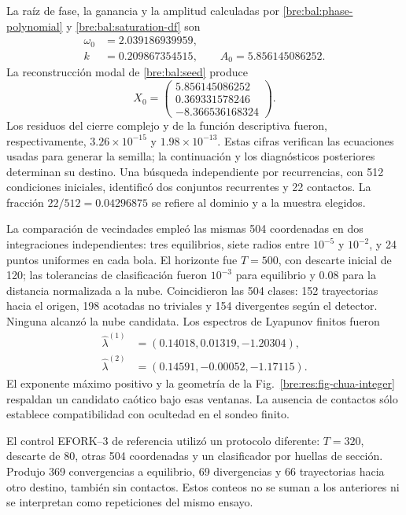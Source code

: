 La raíz de fase, la ganancia y la amplitud
calculadas por \eqref{bre:bal:phase-polynomial} y
\eqref{bre:bal:saturation-df} son
\[
 \begin{aligned}
 \omega_0&=2.039186939959,\\
 k&=0.209867354515,\qquad A_0=5.856145086252.
 \end{aligned}
\]
La reconstrucción modal de \eqref{bre:bal:seed} produce
\begin{equation}
 X_0=\begin{pmatrix}
 5.856145086252\\0.369331578246\\-8.366536168324
 \end{pmatrix}.
 \label{bre:res:chua-integer-seed}
\end{equation}
Los residuos del cierre complejo y de la función descriptiva fueron,
respectivamente, \(3.26\times10^{-15}\) y \(1.98\times10^{-13}\). Estas
cifras verifican las ecuaciones usadas para generar la semilla; la
continuación y los diagnósticos posteriores determinan su destino.
Una búsqueda independiente por recurrencias, con 512 condiciones iniciales,
identificó dos conjuntos recurrentes y 22 contactos. La fracción
\(22/512=0.04296875\) se refiere al dominio y a la muestra elegidos.

La comparación de vecindades empleó las mismas 504 coordenadas en dos
integraciones independientes: tres equilibrios, siete radios entre
\(10^{-5}\) y \(10^{-2}\), y 24 puntos uniformes en cada bola. El horizonte
fue \(T=500\), con descarte inicial de 120; las tolerancias de clasificación
fueron \(10^{-3}\) para equilibrio y \(0.08\) para la distancia normalizada
a la nube. Coincidieron las 504 clases: 152 trayectorias hacia el origen,
198 acotadas no triviales y 154 divergentes según el detector. Ninguna
alcanzó la nube candidata. Los espectros de Lyapunov finitos fueron
\[
 \begin{aligned}
 \widehat\lambda^{(1)}&=(0.14018,0.01319,-1.20304),\\
 \widehat\lambda^{(2)}&=(0.14591,-0.00052,-1.17115).
 \end{aligned}
\]
El exponente máximo positivo y la geometría de la
Fig.~\ref{bre:res:fig-chua-integer} respaldan un candidato caótico bajo esas
ventanas. La ausencia de contactos sólo establece compatibilidad con
ocultedad en el sondeo finito.

El control EFORK--3 de referencia utilizó un protocolo diferente:
\(T=320\), descarte de 80, otras 504 coordenadas y un clasificador por huellas
de sección. Produjo 369 convergencias a equilibrio, 69 divergencias y 66
trayectorias hacia otro destino, también sin contactos. Estos conteos no se
suman a los anteriores ni se interpretan como repeticiones del mismo ensayo.

